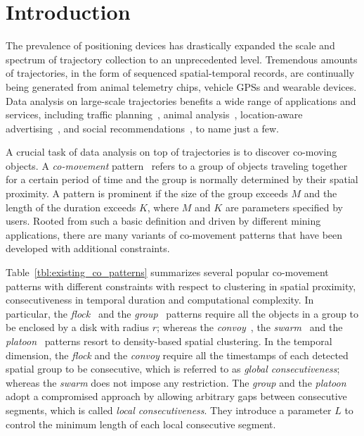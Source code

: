 \section{Introduction}
The prevalence of positioning devices has drastically expanded 
the scale and spectrum of trajectory collection to an unprecedented level. 
Tremendous amounts of trajectories, in the form of sequenced spatial-temporal 
records, are continually being generated from animal telemetry chips, 
vehicle GPSs and wearable devices. Data analysis on large-scale 
trajectories benefits a wide range of applications and services, 
including traffic planning~\cite{zheng2011urban}, animal analysis~\cite{li2010miningperiodic}, location-aware advertising~\cite{guo2016influence},  and social recommendations~\cite{bao2013survey}, to name just a few.

A crucial task of data analysis on top of trajectories is 
to discover co-moving objects. A \emph{co-movement} pattern~\cite{li2013effective,zheng2015survey} 
refers to a group of objects traveling together for a certain period of time 
and the group is normally determined by their spatial proximity. 
A pattern is prominent if the size of the group exceeds $M$ and the length of the duration exceeds $K$, where $M$ and $K$ are parameters specified by users. Rooted from such a basic definition 
and driven by different mining applications, there are many variants 
of co-movement patterns that have been developed with additional constraints.

Table~\ref{tbl:existing_co_patterns} summarizes several popular co-movement patterns 
with different constraints with respect to clustering in spatial proximity,
consecutiveness in temporal duration and computational complexity. 
In particular,  the \emph{flock}~\cite{gudmundsson2006flock} 
and the \emph{group}~\cite{wang2006grouppattern} patterns require 
all the objects in a group to be enclosed by a disk with radius $r$; 
whereas the \emph{convoy}~\cite{jeung2008convoy}, the \emph{swarm}~\cite{li2010swarm} 
and the \emph{platoon}~\cite{li2015platoon} patterns resort to density-based 
spatial clustering. 
In the temporal dimension, the \emph{flock} %
and the \emph{convoy} %
require all the timestamps 
of each detected spatial group to be consecutive, which is referred to as \emph{global consecutiveness}; 
whereas the \emph{swarm} %
does not impose any restriction. 
The \emph{group} %
and the \emph{platoon} %
adopt a compromised approach by allowing
arbitrary gaps between consecutive segments, which is called \emph{local consecutiveness}. 
They introduce a parameter $L$ to control the minimum length of each local consecutive segment.

